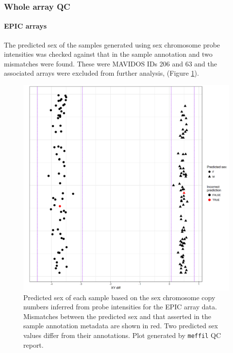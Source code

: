 \documentclass[
]{book}
\begin{document}
\hypertarget{whole-array-qc}{%
\subsubsection{Whole array QC}\label{whole-array-qc}}

\hypertarget{epic-arrays}{%
\paragraph{EPIC arrays}\label{epic-arrays}}

The predicted sex of the samples generated using sex chromosome probe intensities was checked against that in the sample annotation and two mismatches were found.
These were MAVIDOS IDs 206 and 63 and the associated arrays were excluded from further analysis, (Figure \ref{fig:MAVIDOSqcEPICsexMismatch}).

\begin{figure}

{\centering \includegraphics[width=0.8\linewidth]{figs/MAVIDOSqcEPICsexMismatch} 

}

\caption{Predicted sex of each sample based on the sex chromosome copy numbers inferred from probe intensities for the EPIC array data. Mismatches between the predicted sex and that asserted in the sample annotation metadata are shown in red. Two predicted sex values differ from their annotations. Plot generated by \texttt{meffil} QC report.}\label{fig:MAVIDOSqcEPICsexMismatch}
\end{figure}
\end{document}

